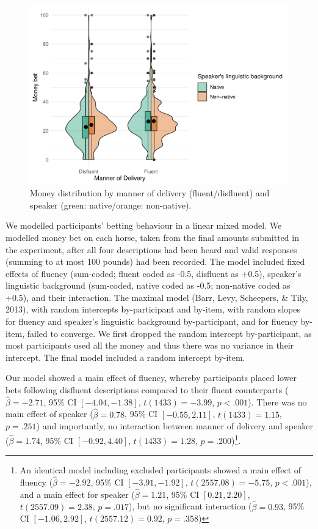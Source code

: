 \documentclass[
  man,floatsintext]{apa7}
\begin{document}
\begin{figure}[H]

{\centering \includegraphics[width=0.9\linewidth,]{manuscript_eb_files/figure-latex/fig1-1} 

}

\caption{Money distribution by manner of delivery (fluent/disfluent) and speaker (green: native/orange: non-native).}\label{fig:fig1}
\end{figure}

We modelled participants' betting behaviour in a linear mixed model. We modelled money bet on each horse, taken from the final amounts submitted in the experiment, after all four descriptions had been heard and valid responses (summing to at most 100 pounds) had been recorded. The model included fixed effects of fluency (sum-coded; fluent coded as -0.5, disfluent as +0.5), speaker's linguistic background (sum-coded, native coded as -0.5; non-native coded as +0.5), and their interaction. The maximal model (Barr, Levy, Scheepers, \& Tily, 2013), with random intercepts by-participant and by-item, with random slopes for fluency and speaker's linguistic background by-participant, and for fluency by-item, failed to converge. We first dropped the random intercept by-participant, as most participants used all the money and thus there was no variance in their intercept. The final model included a random intercept by-item.

Our model showed a main effect of fluency, whereby participants placed lower bets following disfluent descriptions compared to their fluent counterparts (\(\hat{\beta} = -2.71\), 95\% CI \([-4.04, -1.38]\), \(t(1433) = -3.99\), \(p < .001\)). There was no main effect of speaker (\(\hat{\beta} = 0.78\), 95\% CI \([-0.55, 2.11]\), \(t(1433) = 1.15\), \(p = .251\)) and importantly, no interaction between manner of delivery and speaker (\(\hat{\beta} = 1.74\), 95\% CI \([-0.92, 4.40]\), \(t(1433) = 1.28\), \(p = .200\))\footnote{An identical model including excluded participants showed a main effect of fluency (\(\hat{\beta} = -2.92\), 95\% CI \([-3.91, -1.92]\), \(t(2557.08) = -5.75\), \(p < .001\)), and a main effect for speaker (\(\hat{\beta} = 1.21\), 95\% CI \([0.21, 2.20]\), \(t(2557.09) = 2.38\), \(p = .017\)), but no significant interaction (\(\hat{\beta} = 0.93\), 95\% CI \([-1.06, 2.92]\), \(t(2557.12) = 0.92\), \(p = .358\))}.
\end{document}
